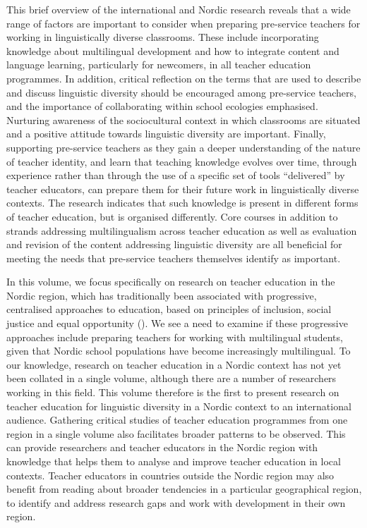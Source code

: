 \documentclass[output=paper]{langscibook}
\begin{document}
This brief overview of the international and Nordic research reveals that a wide range of factors are important to consider when preparing pre-service teachers for working in linguistically diverse classrooms. These include incorporating knowledge about multilingual development and how to integrate content and language learning, particularly for newcomers, in all teacher education programmes. In addition, critical reflection on the terms that are used to describe and discuss linguistic diversity should be encouraged among pre-service teachers, and the importance of collaborating within school ecologies emphasised. Nurturing awareness of the sociocultural context in which classrooms are situated and a positive attitude towards linguistic diversity are important. Finally, supporting pre-service teachers as they gain a deeper understanding of the nature of teacher identity, and learn that teaching knowledge evolves over time, through experience rather than through the use of a specific set of tools “delivered” by teacher educators, can prepare them for their future work in linguistically diverse contexts. The research indicates that such knowledge is present in different forms of teacher education, but is organised differently. Core courses in addition to strands addressing multilingualism across teacher education as well as evaluation and revision of the content addressing linguistic diversity are all beneficial for meeting the needs that pre-service teachers themselves identify as important. 

In this volume, we focus specifically on research on teacher education in the Nordic region, which has traditionally been associated with progressive, centralised approaches to education, based on principles of inclusion, social justice and equal opportunity (\citealt{BlossingEtAl2014,Elstad2020,Frones2020}). We see a need to examine if these progressive approaches include preparing teachers for working with multilingual students, given that Nordic school populations have become increasingly multilingual. To our knowledge, research on teacher education in a Nordic context has not yet been collated in a single volume, although there are a number of researchers working in this field. This volume therefore is the first to present research on teacher education for linguistic diversity in a Nordic context to an international audience. Gathering critical studies of teacher education programmes from one region in a single volume also facilitates broader patterns to be observed. This can provide researchers and teacher educators in the Nordic region with knowledge that helps them to analyse and improve teacher education in local contexts. Teacher educators in countries outside the Nordic region may also benefit from reading about broader tendencies in a particular geographical region, to identify and address research gaps and work with development in their own region.
\end{document}
